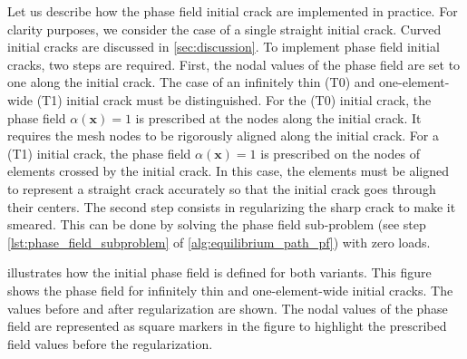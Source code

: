 \documentclass[OptSoft]{jtcam_preprint}
\newcommand{\xx}{\bm{x}}
\begin{document}
Let us describe how the phase field initial crack are implemented in practice.
For clarity purposes, we consider the case of a single straight initial crack.
Curved initial cracks are discussed in \cref{sec:discussion}.
To implement phase field initial cracks, two steps are required.
First, the nodal values of the phase field are set to one along the initial crack.
The case of an infinitely thin (T0) and one-element-wide (T1) initial crack must be distinguished.
For the (T0) initial crack, the phase field $\alpha(\xx) = 1$ is prescribed at the nodes along the initial crack.
It requires the mesh nodes to be rigorously aligned along the initial crack.
For a (T1) initial crack, the phase field $\alpha(\xx) = 1$ is prescribed on the nodes of elements crossed by the initial crack.
In this case, the elements must be aligned to represent a straight crack accurately so that the initial crack goes through their centers.
The second step consists in regularizing the sharp crack to make it smeared.
This can be done by solving the phase field sub-problem (see step \ref{lst:phase_field_subproblem} of \cref{alg:equilibrium_path_pf}) with zero loads.

 illustrates how the initial phase field is defined for both variants.
This figure shows the phase field for infinitely thin and one-element-wide initial cracks.
The values before and after regularization are shown.
The nodal values of the phase field are represented as square markers in the figure to highlight the prescribed field values before the regularization.
\end{document}
